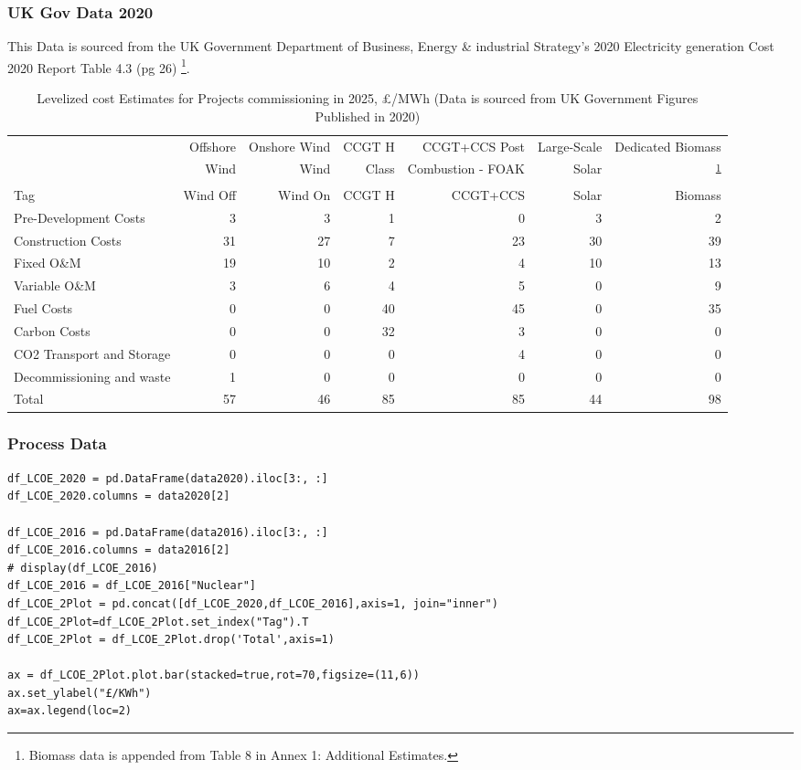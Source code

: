 \documentclass[11pt]{article}
\numberwithin{equation}{section}
\begin{document}
\subsubsection{UK Gov Data 2020}
\label{sec:org9e8502e}
This Data is sourced from the UK Government Department of Business, Energy \& industrial Strategy's 2020 Electricity generation Cost 2020 Report Table 4.3 (pg 26) \cite{DeptEnerLCOE}\footnote{Biomass data is appended from Table 8 in Annex 1: Additional Estimates\cite{DeptEnerLCOE}.\label{orgaa0fe0a}}.
\begin{table}
\caption{\label{tabLCOEBreakdownGov2020}Levelized cost Estimates for Projects commissioning in 2025, £/MWh (Data is sourced from UK Government Figures Published in 2020\cite{DeptEnerLCOE})}
\centering
\begin{tabular}{lrrrrrr}
\toprule
 & Offshore & Onshore Wind & CCGT H & CCGT+CCS Post & Large-Scale & Dedicated Biomass\\
 & Wind & Wind & Class & Combustion - FOAK & Solar & \textsuperscript{\ref{orgaa0fe0a}}\\
\midrule
Tag & Wind Off & Wind On & CCGT H & CCGT+CCS & Solar & Biomass\\
Pre-Development Costs & 3 & 3 & 1 & 0 & 3 & 2\\
Construction Costs & 31 & 27 & 7 & 23 & 30 & 39\\
Fixed O\&M & 19 & 10 & 2 & 4 & 10 & 13\\
Variable O\&M & 3 & 6 & 4 & 5 & 0 & 9\\
Fuel Costs & 0 & 0 & 40 & 45 & 0 & 35\\
Carbon Costs & 0 & 0 & 32 & 3 & 0 & 0\\
CO2 Transport and Storage & 0 & 0 & 0 & 4 & 0 & 0\\
Decommissioning and waste & 1 & 0 & 0 & 0 & 0 & 0\\
Total & 57 & 46 & 85 & 85 & 44 & 98\\
\bottomrule
\end{tabular}
\end{table}
\subsubsection{Process Data}
\label{sec:org8127e78}
\begin{verbatim}
df_LCOE_2020 = pd.DataFrame(data2020).iloc[3:, :]
df_LCOE_2020.columns = data2020[2]

df_LCOE_2016 = pd.DataFrame(data2016).iloc[3:, :]
df_LCOE_2016.columns = data2016[2]
# display(df_LCOE_2016)
df_LCOE_2016 = df_LCOE_2016["Nuclear"]
df_LCOE_2Plot = pd.concat([df_LCOE_2020,df_LCOE_2016],axis=1, join="inner")
df_LCOE_2Plot=df_LCOE_2Plot.set_index("Tag").T
df_LCOE_2Plot = df_LCOE_2Plot.drop('Total',axis=1)

ax = df_LCOE_2Plot.plot.bar(stacked=true,rot=70,figsize=(11,6))
ax.set_ylabel("£/KWh")
ax=ax.legend(loc=2)
\end{verbatim}
\end{document}
